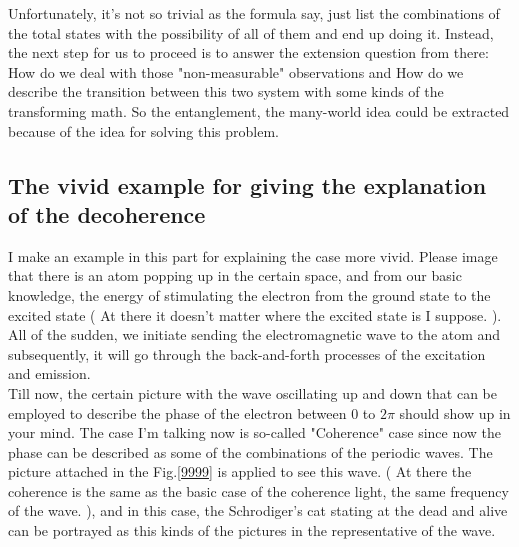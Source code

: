 \documentclass[final,1p,12pt]{elsarticle}
\begin{document}
Unfortunately, it's not so trivial as the formula say, just list the combinations of the total states with the possibility of all of them and end up doing it. Instead, the next step for us to proceed is to answer the extension question from there: How do we deal with those "non-measurable" observations and How do we describe the transition between this two system with some kinds of the transforming math. So the entanglement, the many-world idea could be extracted because of the idea for solving this problem.\\

\subsection{The vivid example for giving the explanation of the decoherence}
I make an example in this part for explaining the case more vivid. Please image that there is an atom popping up in the certain space, and from our basic knowledge, the energy of stimulating the electron from the ground state to the excited state ( At there it doesn't matter where the excited state is I suppose. ). All of the sudden, we initiate sending the electromagnetic wave to the atom and subsequently, it will go through the back-and-forth processes of the excitation and emission. \\

Till now, the certain picture with the wave oscillating up and down that can be employed to describe the phase of the electron between 0 to $2\pi$ should show up in your mind. The case I'm talking now is so-called "Coherence" case since now the phase can be described as some of the combinations of the periodic waves. The picture attached in the Fig.\ref{9999} is applied to see this wave. ( At there the coherence is the same as the basic case of the coherence light, the same frequency of the wave. ), and in this case, the Schrodiger's cat stating at the dead and alive can be portrayed as this kinds of the pictures in the representative of the wave.\\ 
\end{document}

